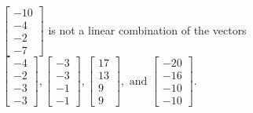 \begin{exercise}
\begin{exerciseStatement}
  \end{exerciseStatement}
  \begin{exerciseAnswer}
   \(\left[\begin{array}{c}
-10 \\
-4 \\
-2 \\
-7
\end{array}\right]\) 
  	 is not  
	a linear combination of the vectors \(\left[\begin{array}{c}
-4 \\
-2 \\
-3 \\
-3
\end{array}\right] , \left[\begin{array}{c}
-3 \\
-3 \\
-1 \\
-1
\end{array}\right] , \left[\begin{array}{c}
17 \\
13 \\
9 \\
9
\end{array}\right] , \text{ and } \left[\begin{array}{c}
-20 \\
-16 \\
-10 \\
-10
\end{array}\right]\).

	
  


  \end{exerciseAnswer}
\end{exercise}